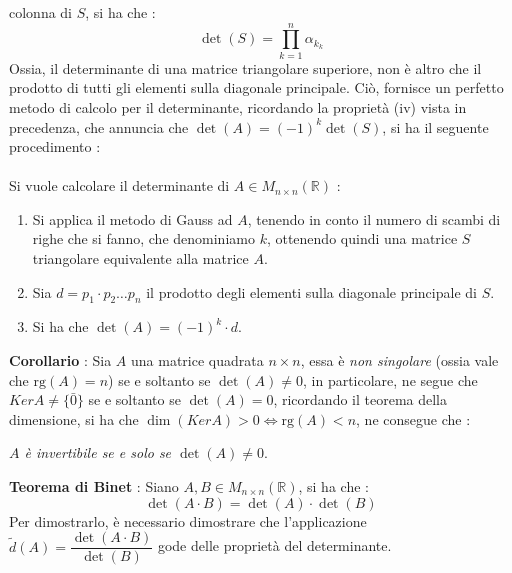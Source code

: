 \documentclass[12pt, letterpaper]{article}
\newcommand{\R}{{\mathbb R}}
\newcommand{\rg}{{\text{rg}}}
\newcommand{\acc}{\\\hphantom{}\\}
\begin{document}
colonna di \(S\), si ha che :$$\det(S)=\prod_{k=1}^n\alpha_{k_k}$$
Ossia, il determinante di una matrice triangolare superiore, non è altro che il prodotto di tutti gli 
elementi sulla diagonale principale. Ciò, fornisce un perfetto metodo di calcolo per il determinante, ricordando 
la proprietà (iv) vista in precedenza, che annuncia che \(\det(A)=(-1)^k\det(S)\), si ha il seguente procedimento :\acc
Si vuole calcolare il determinante di \(A\in M_{n\times n}(\R)\) :
\begin{enumerate}
    \item Si applica il metodo di Gauss ad \(A\), tenendo in conto il numero di scambi di righe che si fanno, che denominiamo 
    \(k\), ottenendo quindi una matrice \(S\) triangolare equivalente alla matrice \(A\).
    \item Sia \(d=p_1\cdot p_2\dots p_n\) il prodotto degli elementi sulla diagonale principale di \(S\).
    \item Si ha che \(\det(A)=(-1)^k\cdot d\).
\end{enumerate}
\textbf{Corollario} : Sia \(A\) una matrice quadrata \(n\times n\), essa è \textit{non singolare} (ossia vale che \(\rg(A)=n\)) se 
e soltanto se \(\det (A)\ne0\), in particolare, ne segue che \(KerA\ne\{\bar 0\}\) se e soltanto se \(\det(A)=0\), ricordando 
il teorema della dimensione, si ha che \(\dim(KerA)>0\iff \rg(A)<n\), ne consegue che : \begin{center}\textit{\(A\) è invertibile se e solo 
se \(\det(A)\ne0\)}.\end{center}
\textbf{Teorema di Binet} : Siano \(A,B\in M_{n\times n}(\R)\), si ha che : $$\det(A\cdot B)=\det(A)\cdot\det(B)$$
Per dimostrarlo, è necessario dimostrare che l'applicazione \(\tilde d(A)=\dfrac{\det(A\cdot B)}{\det(B)}\) gode 
delle proprietà del determinante.
\end{document}
